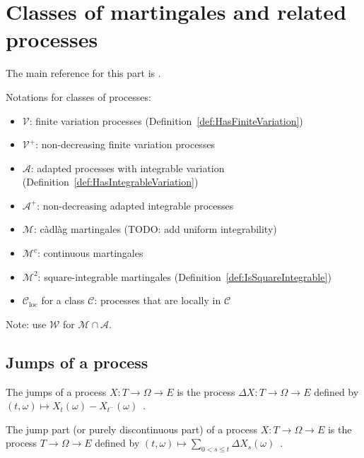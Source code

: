 \chapter{Classes of martingales and related processes}

The main reference for this part is \cite{he2019semimartingale}.

Notations for classes of processes:
\begin{itemize}
  \item $\mathcal{V}$: finite variation processes (Definition~\ref{def:HasFiniteVariation})
  \item $\mathcal{V}^+$: non-decreasing finite variation processes
  \item $\mathcal{A}$: adapted processes with integrable variation (Definition~\ref{def:HasIntegrableVariation})
  \item $\mathcal{A}^+$: non-decreasing adapted integrable processes
  \item $\mathcal{M}$: càdlàg martingales (TODO: \cite{he2019semimartingale} add uniform integrability)
  \item $\mathcal{M}^c$: continuous martingales
  \item $\mathcal{M}^2$: square-integrable martingales (Definition~\ref{def:IsSquareIntegrable})
  \item $\mathcal{C}_{\mathrm{loc}}$ for a class $\mathcal{C}$: processes that are locally in $\mathcal{C}$
\end{itemize}

Note: \cite{he2019semimartingale} use $\mathcal{W}$ for $\mathcal{M} \cap \mathcal{A}$.

\section{Jumps of a process}

\begin{definition}\label{def:jump}
  \leanok
The jumps of a process $X : T \to \Omega \to E$ is the process $\Delta X : T \to \Omega \to E$ defined by $(t, \omega) \mapsto X_t(\omega) - X_{t^-}(\omega)$~.
\end{definition}


\begin{definition}\label{def:jumpPart}
The jump part (or purely discontinuous part) of a process $X : T \to \Omega \to E$ is the process $T \to \Omega \to E$ defined by $(t, \omega) \mapsto \sum_{0 < s \le t} \Delta X_s(\omega)$~.
\end{definition}


